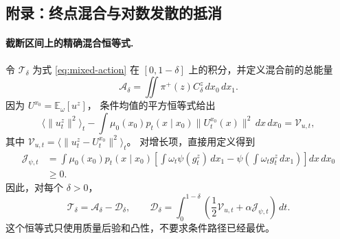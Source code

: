 \documentclass[UTF8,a4paper,11pt,fontset=fandol]{ctexart}
\begin{document}
\clearpage
\setcounter{equation}{0}
\renewcommand{\theequation}{B.\arabic{equation}}
\renewcommand{\theHequation}{B.\arabic{equation}}
\subsection*{附录：终点混合与对数发散的抵消}

\paragraph{截断区间上的精确混合恒等式.}
令 $\mathcal T_\delta$ 为式 \eqref{eq:mixed-action}
在 $[0,1-\delta]$ 上的积分，并定义混合前的总能量
\begin{equation}
\mathcal A_\delta=\iint\pi^+(z)C_\delta^z\,dx_0\,dx_1.
\end{equation}
因为 $U^{x_0}=\mathbb E_{\omega}[u^z]$，
条件均值的平方恒等式给出
\begin{equation}
\langle\|u_t^z\|^2\rangle_t
-\int\mu_0(x_0)p_t(x\mid x_0)\|U_t^{x_0}(x)\|^2\,dx\,dx_0
=\mathcal V_{u,t},
\end{equation}
其中 $\mathcal V_{u,t}=\langle\|u_t^z-U_t^{x_0}\|^2\rangle_t$。
对增长项，直接用定义得到
\begin{equation}
\begin{aligned}
\mathcal J_{\psi,t}
&=\int\mu_0(x_0)p_t(x\mid x_0)
\left[
\int\omega_t\psi(g_t^z)\,dx_1
-\psi\left(\int\omega_tg_t^z\,dx_1\right)
\right]dx\,dx_0\\
&\ge0.
\end{aligned}
\label{eq:jensen-gap}
\end{equation}
因此，对每个 $\delta>0$，
\begin{equation}
\boxed{
\mathcal T_\delta=\mathcal A_\delta-\mathcal D_\delta,\qquad
\mathcal D_\delta
=\int_0^{1-\delta}
\left(\frac12\mathcal V_{u,t}+\alpha\mathcal J_{\psi,t}\right)\,dt.
}
\label{eq:exact-mixing}
\end{equation}
这个恒等式只使用质量后验和凸性，不要求条件路径已经最优。
\end{document}
